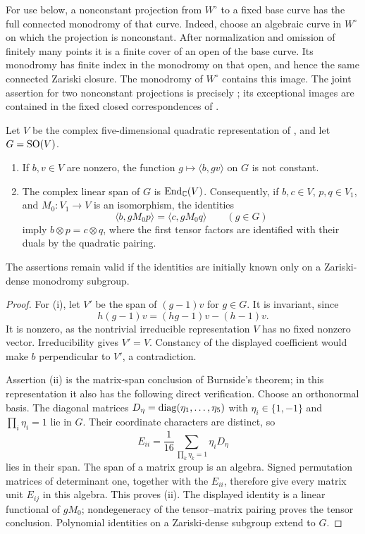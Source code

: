 For use below, a nonconstant projection from $W^\circ$ to a fixed base
curve has the full connected monodromy of that curve.  Indeed, choose
an algebraic curve in $W^\circ$ on which the projection is nonconstant.
After normalization and omission of finitely many points it is a finite
cover of an open of the base curve.  Its monodromy has finite index in
the monodromy on that open, and hence the same connected Zariski closure.
The monodromy of $W^\circ$ contains this image.  The joint assertion for
two nonconstant projections is precisely ; its
exceptional images are contained in the fixed closed correspondences
of .

\begin{lemma}
\label{nid:matrix-span}
Let $V$ be the complex five-dimensional quadratic representation of
, and let $G=\operatorname{SO}(V)$.
\begin{enumerate}[label=\textup{(\roman*)}]
\item If $b,v\in V$ are nonzero, the function
$g\mapsto\langle b,gv\rangle$ on $G$ is not constant.
\item The complex linear span of $G$ is $\operatorname{End}_{\mathbb C}(V)$.
Consequently, if $b,c\in V$, $p,q\in V_1$, and $M_0:V_1\to V$ is
an isomorphism, the identities
\[
 \langle b,gM_0p\rangle=\langle c,gM_0q\rangle\qquad(g\in G)
\]
imply $b\otimes p=c\otimes q$, where the first tensor factors are
identified with their duals by the quadratic pairing.
\end{enumerate}
The assertions remain valid if the identities are initially known only
on a Zariski-dense monodromy subgroup.
\end{lemma}

\begin{proof}
For (i), let $V'$ be the span of $(g-1)v$ for $g\in G$.  It is invariant,
since
\[
 h(g-1)v=(hg-1)v-(h-1)v.
\]
It is nonzero, as the nontrivial irreducible representation $V$ has no
fixed nonzero vector.  Irreducibility gives $V'=V$.  Constancy of the
displayed coefficient would make $b$ perpendicular to $V'$, a
contradiction.

Assertion (ii) is the matrix-span conclusion of Burnside's theorem; in
this representation it also has the following direct verification.
Choose an orthonormal basis.  The diagonal matrices
$D_\eta=\operatorname{diag}(\eta_1,\ldots,\eta_5)$ with $\eta_i\in\{1,-1\}$ and
$\prod_i\eta_i=1$ lie in $G$.  Their coordinate characters are distinct,
so
\[
 E_{ii}=\frac1{16}\sum_{\prod_k\eta_k=1}\eta_iD_\eta
\]
lies in their span.  The span of a matrix group is an algebra.  Signed
permutation matrices of determinant one, together with the $E_{ii}$,
therefore give every matrix unit $E_{ij}$ in this algebra.  This proves
(ii).  The displayed identity is a linear functional of $gM_0$;
nondegeneracy of the tensor--matrix pairing proves the tensor conclusion.
Polynomial identities on a Zariski-dense subgroup extend to $G$.
\end{proof}

